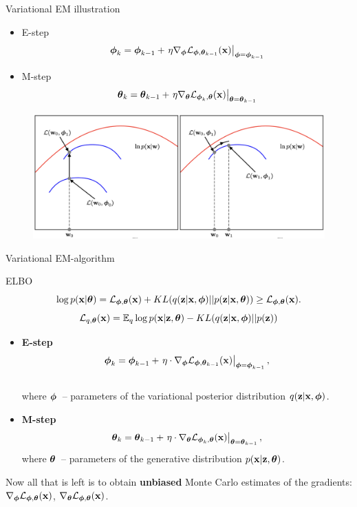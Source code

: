 \begin{frame}{Variational EM illustration}
	\begin{itemize}
		\item E-step
		\[
			\bphi_k = \bphi_{k-1} + \left.\eta \nabla_{\bphi} \cL_{\bphi, \btheta_{k-1}}(\bx)\right|_{\bphi=\bphi_{k-1}}
		\]
		\item M-step
		\[
			\btheta_k = \btheta_{k-1} + \left.\eta \nabla_{\btheta} \cL_{\bphi_k, \btheta}(\bx)\right|_{\btheta=\btheta_{k-1}}
		\]
	\end{itemize}
	\begin{figure}
		\includegraphics[width=\linewidth]{figs/em_bishop4}
	\end{figure}
		
\end{frame}
\begin{frame}{Variational EM-algorithm}
	\begin{block}{ELBO}
		\vspace{-0.5cm}
		\[
			\log p(\bx| \btheta) = \cL_{\bphi, \btheta}(\bx) + KL(q(\bz | \bx, \bphi) || p(\bz|\bx, \btheta)) \geq \cL_{\bphi, \btheta}(\bx).
		\]
		\[
		 	\cL_{q, \btheta}(\bx) = \mathbb{E}_{q} \log p(\bx | \bz, \btheta) - KL(q(\bz | \bx, \bphi) || p(\bz))
		\]
		\vspace{-0.5cm}
	\end{block}
	\begin{itemize}
		\item \textbf{E-step}
		\vspace{-0.3cm}
		\[
			\bphi_k = \bphi_{k-1} + \left.\eta \cdot \nabla_{\bphi} \cL_{\bphi, \btheta_{k-1}}(\bx)\right|_{\bphi=\bphi_{k-1}},
		\]
		\vspace{-0.3cm} \\
		where $\bphi$~-- parameters of the variational posterior distribution $q(\bz | \bx, \bphi)$.
		\item \textbf{M-step}
		\[
			\btheta_k = \btheta_{k-1} + \left.\eta \cdot \nabla_{\btheta} \cL_{\bphi_k, \btheta}(\bx)\right|_{\btheta=\btheta_{k-1}},
		\]
		where $\btheta$~-- parameters of the generative distribution $p(\bx | \bz, \btheta)$.
	\end{itemize}
	Now all that is left is to obtain \textbf{unbiased} Monte Carlo estimates of the gradients: $\nabla_{\bphi} \cL_{\bphi, \btheta}(\bx)$, $\nabla_{\btheta} \cL_{\bphi, \btheta}(\bx)$. 
\end{frame}
